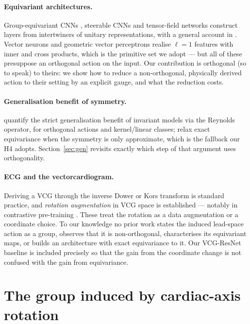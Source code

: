 \documentclass[11pt]{article}
\theoremstyle{definition}
\begin{document}
\paragraph{Equivariant architectures.} Group-equivariant CNNs \citep{cohen2016gcnn},
steerable CNNs \citep{cohen2017steerable,weiler2018steerable3d} and tensor-field
networks \citep{thomas2018tfn} construct layers from intertwiners of unitary
representations, with a general account in \citet{cohen2019general}. Vector neurons
\citep{deng2021vn} and geometric vector perceptrons \citep{jing2021gvp} realise
$\ell{=}1$ features with inner and cross products, which is the primitive set we adopt --- but all of these presuppose an orthogonal action on the
input. Our contribution is orthogonal (so to speak) to theirs: we show how to reduce a
non-orthogonal, physically derived action to their setting by an explicit gauge, and
what the reduction costs.

\paragraph{Generalisation benefit of symmetry.} \citet{elesedy2021strict} quantify the
strict generalisation benefit of invariant models via the Reynolds operator, for
orthogonal actions and kernel/linear classes; \citet{wang2022approx} relax exact
equivariance when the symmetry is only approximate, which is the fallback our H4
adopts. Section~\ref{sec:gen} revisits exactly
which step of that argument uses orthogonality.

\paragraph{ECG and the vectorcardiogram.} Deriving a VCG through the inverse Dower
\citep{dower1980,edenbrandt1988} or Kors \citep{kors1990} transform is standard
practice, and \emph{rotation augmentation} in VCG space is established --- notably in
contrastive pre-training \citep{gopal20213kg}. These treat the rotation as a data
augmentation or a coordinate choice. To our knowledge no prior work states the induced
lead-space action as a group, observes that it is non-orthogonal, characterises its
equivariant maps, or builds an architecture with exact equivariance to it. Our
VCG-ResNet baseline is included precisely so that the gain from the coordinate change
is not confused with the gain from equivariance.

\section{The group induced by cardiac-axis rotation}\label{sec:setup}
\end{document}
